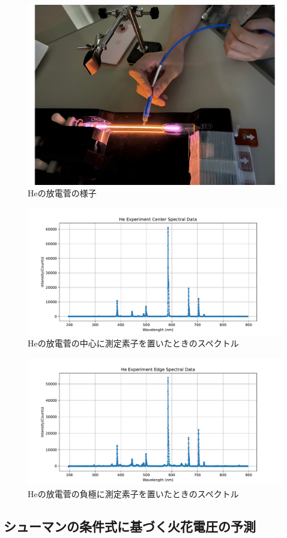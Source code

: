 \documentclass[a4j,twocolumn]{jsarticle}
\begin{document}
\begin{figure}[htb]
    \centering
    \includegraphics[keepaspectratio,width=0.6\columnwidth]{fig/latexmkrc.pdf}
    \caption{Heの放電菅の様子}
\end{figure}
\begin{figure}[htb]
    \centering
    \includegraphics[keepaspectratio,width=0.6\columnwidth]{fig/He_center.pdf}
    \caption{Heの放電菅の中心に測定素子を置いたときのスペクトル}
\end{figure}
\begin{figure}[htb]
    \centering
    \includegraphics[keepaspectratio,width=0.6\columnwidth]{fig/He_edge.pdf}
    \caption{Heの放電菅の負極に測定素子を置いたときのスペクトル}
\end{figure}




\subsection*{シューマンの条件式に基づく火花電圧の予測}
\end{document}
